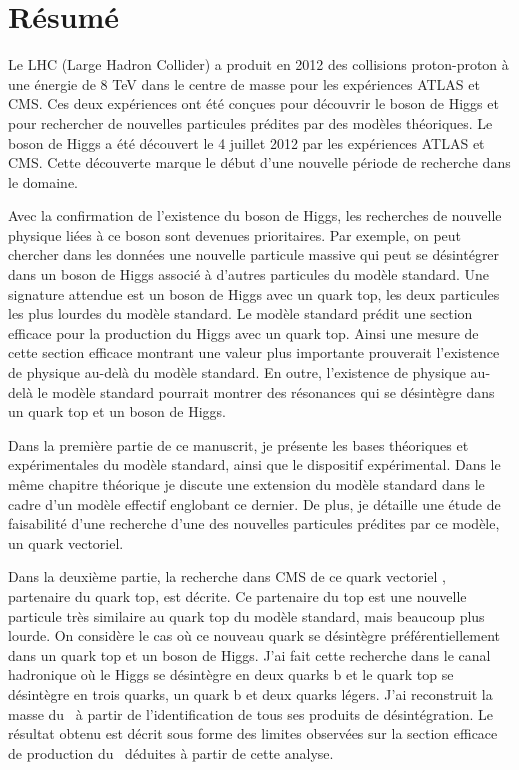 \begin{otherlanguage}{francais}
\chapter*{R\'{e}sum\'{e}}

Le LHC (Large Hadron Collider) a produit en 2012 des collisions proton-proton à une énergie de 8 TeV  dans le centre de masse pour les expériences ATLAS et CMS. Ces deux expériences ont été conçues pour découvrir le boson de Higgs et pour rechercher de nouvelles particules prédites par des modèles théoriques. Le boson de Higgs a été découvert le 4 juillet 2012 par les expériences ATLAS et CMS. Cette découverte marque le début  d'une nouvelle période de recherche dans le domaine. 

Avec la confirmation de l'existence du boson de Higgs, les recherches de nouvelle physique liées à ce boson sont devenues prioritaires. Par exemple, on peut chercher dans les données une nouvelle particule massive qui peut se désintégrer dans un boson de Higgs associé à d'autres particules du modèle standard. Une signature attendue est un boson de Higgs avec un quark top, les deux particules les plus lourdes du modèle standard. Le modèle standard prédit une section efficace pour la production du Higgs avec un quark top. Ainsi une mesure de cette section efficace montrant une valeur plus importante prouverait l'existence de physique au-delà du modèle standard. En outre, l'existence de physique au-delà le modèle standard pourrait montrer des résonances qui se désintègre dans un quark top et un boson de Higgs.

Dans la première partie de ce manuscrit, je présente les bases théoriques et expérimentales du modèle standard, ainsi que le dispositif expérimental. Dans le même chapitre théorique je discute une extension du modèle standard dans le cadre d'un modèle effectif englobant ce dernier. De plus, je détaille une étude de faisabilité d'une recherche d'une des nouvelles particules prédites par ce modèle, un quark vectoriel.

Dans la deuxième partie, la recherche dans CMS de ce quark vectoriel \Tp,  partenaire du quark top, est décrite. Ce partenaire du top est une nouvelle particule très similaire au quark top du modèle standard, mais beaucoup plus lourde. On considère le cas où ce nouveau quark se désintègre préférentiellement dans un quark top et un boson de Higgs. J'ai fait cette recherche dans le canal hadronique où le Higgs se désintègre en deux quarks b et le quark top se désintègre en trois quarks, un quark b et deux quarks légers. J'ai reconstruit la masse du \Tp~à partir de l'identification de tous ses produits de désintégration. Le résultat obtenu est décrit sous forme des limites observées sur la section efficace de production du \Tp~déduites à partir de cette analyse.
\end{otherlanguage}  

\endgroup